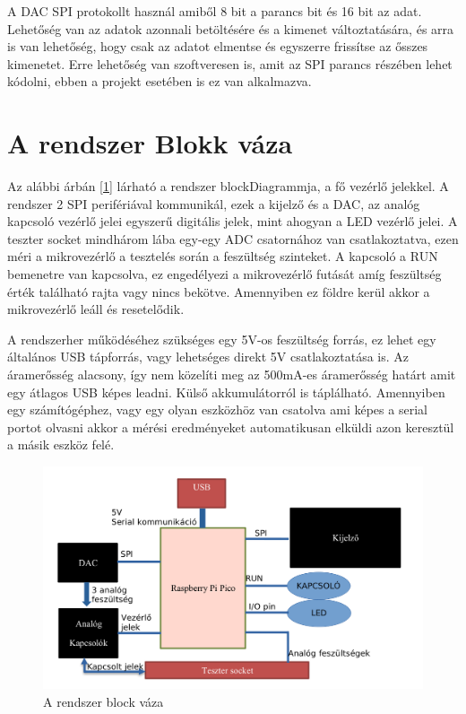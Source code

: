 A DAC SPI protokollt használ amiből 8 bit a parancs bit és 16 bit az adat.
Lehetőség van az adatok azonnali betöltésére és a kimenet változtatására, és
arra is van lehetőség, hogy csak az adatot elmentse és egyszerre frissítse az
ősszes kimenetet. Erre lehetőség van szoftveresen is, amit az SPI parancs
részében lehet kódolni, ebben a projekt esetében is ez van alkalmazva. 







\section{A rendszer Blokk váza}

Az alábbi árbán [\ref{fig:blockDiagramm}] lárható a rendszer blockDiagrammja, a fő vezérlő jelekkel.
A rendszer 2 SPI perifériával kommunikál, ezek a kijelző és a DAC, az analóg kapcsoló vezérlő jelei 
egyszerű digitális jelek, mint ahogyan a LED vezérlő jelei. A teszter socket mindhárom lába egy-egy ADC
csatornához van csatlakoztatva, ezen méri a mikrovezérlő a tesztelés során a feszültség szinteket.
A kapcsoló a RUN bemenetre van kapcsolva, ez engedélyezi a mikrovezérlő futását amíg feszültség érték 
található rajta vagy nincs bekötve. Amennyiben ez földre kerül akkor a mikrovezérlő leáll és resetelődik.

A rendszerher működéséhez szükséges egy 5V-os feszültség forrás, ez lehet egy általános USB
tápforrás, vagy lehetséges direkt 5V csatlakoztatása is. Az áramerősség alacsony, így nem közelíti
meg az 500mA-es áramerősség határt amit egy átlagos USB képes leadni. Külső akkumulátorról
is táplálható. Amennyiben egy számítógéphez, vagy egy olyan eszközhöz van csatolva ami képes 
a serial portot olvasni akkor a mérési eredményeket automatikusan elküldi azon keresztül a 
másik eszköz felé. 


\begin{figure}[h]
    \centering
    \includegraphics[scale=0.3]{figures/images/literature/blockDiagramm.png}
    \caption{A rendszer block váza}
    \label{fig:blockDiagramm}
\end{figure}







